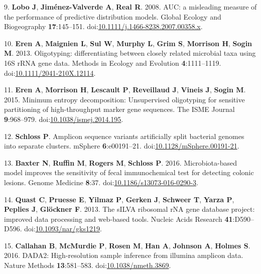 \documentclass[]{article}
\begin{document}
9. \textbf{{Lobo} J}, \textbf{{Jiménez-Valverde} A}, \textbf{{Real} R}.
2008. AUC: a misleading measure of the performance of predictive
distribution models. Global Ecology and Biogeography
\textbf{17}:145--151.
doi:\href{http://dx.doi.org/10.1111/j.1466-8238.2007.00358.x}{10.1111/j.1466-8238.2007.00358.x}.

10. \textbf{{Eren} A}, \textbf{{Maignien} L}, \textbf{{Sul} W},
\textbf{{Murphy} L}, \textbf{{Grim} S}, \textbf{{Morrison} H},
\textbf{{Sogin} M}. 2013. Oligotyping: differentiating between closely
related microbial taxa using 16S rRNA gene data. Methods in Ecology and
Evolution \textbf{4}:1111--1119.
doi:\href{http://dx.doi.org/10.1111/2041-210X.12114}{10.1111/2041-210X.12114}.

11. \textbf{{Eren} A}, \textbf{{Morrison} H}, \textbf{{Lescault} P},
\textbf{{Reveillaud} J}, \textbf{{Vineis} J}, \textbf{{Sogin} M}. 2015.
Minimum entropy decomposition: Unsupervised oligotyping for sensitive
partitioning of high-throughput marker gene sequences. The ISME Journal
\textbf{9}:968--979.
doi:\href{http://dx.doi.org/10.1038/ismej.2014.195}{10.1038/ismej.2014.195}.

12. \textbf{{Schloss} P}. Amplicon sequence variants artificially split
bacterial genomes into separate clusters. mSphere \textbf{6}:e00191--21.
doi:\href{http://dx.doi.org/10.1128/mSphere.00191-21}{10.1128/mSphere.00191-21}.

13. \textbf{{Baxter} N}, \textbf{{Ruffin} M}, \textbf{{Rogers} M},
\textbf{{Schloss} P}. 2016. Microbiota-based model improves the
sensitivity of fecal immunochemical test for detecting colonic lesions.
Genome Medicine \textbf{8}:37.
doi:\href{http://dx.doi.org/10.1186/s13073-016-0290-3}{10.1186/s13073-016-0290-3}.

14. \textbf{{Quast} C}, \textbf{{Pruesse} E}, \textbf{{Yilmaz} P},
\textbf{{Gerken} J}, \textbf{{Schweer} T}, \textbf{{Yarza} P},
\textbf{{Peplies} J}, \textbf{{Glöckner} F}. 2013. The sILVA ribosomal
rNA gene database project: improved data processing and web-based tools.
Nucleic Acids Research \textbf{41}:D590--D596.
doi:\href{http://dx.doi.org/10.1093/nar/gks1219}{10.1093/nar/gks1219}.

15. \textbf{{Callahan} B}, \textbf{{McMurdie} P}, \textbf{{Rosen} M},
\textbf{{Han} A}, \textbf{{Johnson} A}, \textbf{{Holmes} S}. 2016.
DADA2: High-resolution sample inference from illumina amplicon data.
Nature Methods \textbf{13}:581--583.
doi:\href{http://dx.doi.org/10.1038/nmeth.3869}{10.1038/nmeth.3869}.
\end{document}
